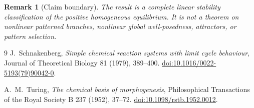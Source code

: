 \documentclass[10pt]{article}
\newtheorem{remark}[theorem]{Remark}
\begin{document}
\begin{remark}[Claim boundary]
The result is a complete \emph{linear} stability classification of the
positive homogeneous equilibrium.  It is not a theorem on nonlinear
patterned branches, nonlinear global well-posedness, attractors, or pattern
selection.
\end{remark}

\begin{thebibliography}{9}
J.~Schnakenberg,
\emph{Simple chemical reaction systems with limit cycle behaviour},
Journal of Theoretical Biology 81 (1979), 389--400.
\href{https://doi.org/10.1016/0022-5193(79)90042-0}{doi:10.1016/0022-5193(79)90042-0}.

A.~M.~Turing,
\emph{The chemical basis of morphogenesis},
Philosophical Transactions of the Royal Society B 237 (1952), 37--72.
\href{https://doi.org/10.1098/rstb.1952.0012}{doi:10.1098/rstb.1952.0012}.
\end{thebibliography}
\fi
\end{document}
